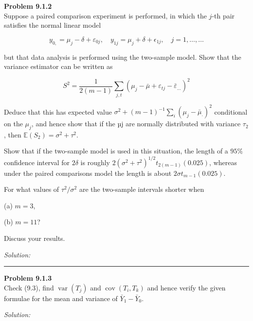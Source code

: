 \documentclass[a4paper, 11pt]{article}
\newenvironment{problem}[2][Problem]
    { \begin{mdframed}[backgroundcolor=gray!20] \textbf{#1 #2} \\}
    {  \end{mdframed}}
\newenvironment{solution}
    {\textit{Solution:}}
    {}
\begin{document}
\begin{problem}{9.1.2}
Suppose a paired comparison experiment is performed, in which the $j$-th pair satisfies the normal linear model

$$y_{0,}=\mu_{j}-\delta+\varepsilon_{0 j}, \quad y_{1 j}=\mu_{j}+\delta+\epsilon_{1 j}, \quad j=1, \ldots, \ldots$$

but that data analysis is performed using the two-sample model. Show that the variance estimator can be written as

$$S^{2}=\frac{1}{2(m-1)} \sum_{j, t}\left(\mu_{j}-\bar{\mu}+\varepsilon_{t j}-\bar{\varepsilon}_{\ldots}\right)^{2}$$

Deduce that this has expected value $\sigma^{2}+(m-1)^{-1} \sum_{i}\left(\mu_{j}-\bar{\mu}_{\cdot}\right)^{2}$ conditional on the $\mu_j$, and hence show that if the µj are normally distributed with variance $\tau_2$, then $\mathbb{E}(S_2) =\sigma^{2}+\tau^{2}$.

Show that if the two-sample model is used in this situation, the length of a $95\%$ confidence interval for $2\delta$ is roughly $2\left(\sigma^{2}+\tau^{2}\right)^{1 / 2} t_{2(m-1)}(0.025)$, whereas under the paired comparisons model the length is about $2 \sigma t_{m-1}(0.025)$. 

For what values of $\tau^{2} / \sigma^{2}$ are the two-sample intervals shorter when 

(a) $m = 3$, 

(b) $m = 11$? 

Discuss your results.
\end{problem}
\begin{solution}
\end{solution} 

\noindent\rule{7in}{2.8pt}

\begin{problem}{9.1.3}
	Check (9.3), find $\operatorname{var}\left(T_{j}\right)$ and $\operatorname{cov}\left(T_{i}, T_{k}\right)$ and hence verify the given formulae for the mean and variance of $\bar{Y}_{1}-\bar{Y}_{0}$.
\end{problem}
\begin{solution}
\end{solution} 
\end{document}
